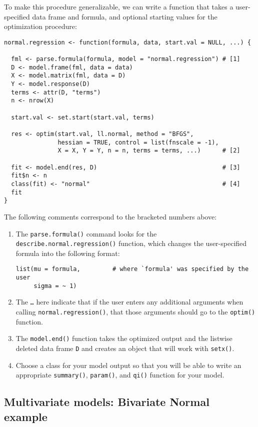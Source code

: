 To make this procedure generalizable, we can write a function that
takes a user-specified data frame and formula, and optional starting
values for the optimization procedure:  
\begin{verbatim}
normal.regression <- function(formula, data, start.val = NULL, ...) {

  fml <- parse.formula(formula, model = "normal.regression") # [1]
  D <- model.frame(fml, data = data)
  X <- model.matrix(fml, data = D)
  Y <- model.response(D)
  terms <- attr(D, "terms")
  n <- nrow(X)

  start.val <- set.start(start.val, terms)

  res <- optim(start.val, ll.normal, method = "BFGS",        
               hessian = TRUE, control = list(fnscale = -1),
               X = X, Y = Y, n = n, terms = terms, ...)      # [2]

  fit <- model.end(res, D)                                   # [3]
  fit$n <- n
  class(fit) <- "normal"                                     # [4]
  fit                                                        
}
\end{verbatim} %
The following comments correspond to the bracketed numbers above:  
\begin{enumerate}
\item The {\tt parse.formula()} command looks for the {\tt
describe.normal.regression()} function, which changes the
user-specified formula into the following format:  
\begin{verbatim}
list(mu = formula,         # where `formula' was specified by the user
     sigma = ~ 1)
\end{verbatim}
\item The {\tt \dots} here indicate that if the user enters any
additional arguments when calling {\tt normal.regression()}, that
those arguments should go to the {\tt optim()} function.  
\item The {\tt model.end()} function takes the optimized output and
the listwise deleted data frame {\tt D} and creates an object that
will work with {\tt setx()}.  
\item Choose a class for your model output so that you will be able to
write an appropriate {\tt summary()}, {\tt param()}, and {\tt qi()}
function for your model.  
\end{enumerate}

\subsection{Multivariate models: Bivariate Normal example}\label{bivariate.probit}

